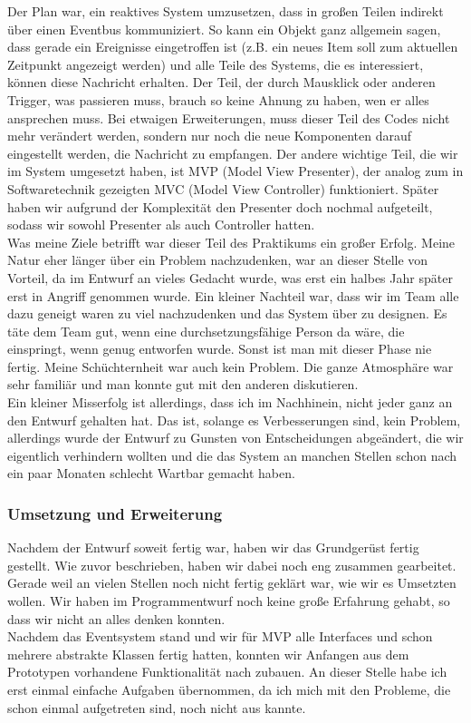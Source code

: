 Der Plan war, ein reaktives System umzusetzen, dass in großen Teilen indirekt über einen Eventbus kommuniziert. So kann ein Objekt ganz allgemein sagen, dass gerade ein Ereignisse eingetroffen ist (z.B. ein neues Item soll zum aktuellen Zeitpunkt angezeigt werden) und alle Teile des Systems, die es interessiert, können diese Nachricht erhalten. Der Teil, der durch Mausklick oder anderen Trigger, was passieren muss, brauch so keine Ahnung zu haben, wen er alles ansprechen muss. Bei etwaigen Erweiterungen, muss dieser Teil des Codes nicht mehr verändert werden, sondern nur noch die neue Komponenten darauf eingestellt werden, die Nachricht zu empfangen. Der andere wichtige Teil, die wir im System umgesetzt haben, ist MVP (Model View Presenter), der analog zum in Softwaretechnik gezeigten MVC (Model View Controller) funktioniert. Später haben wir aufgrund der Komplexität den Presenter doch nochmal aufgeteilt, sodass wir sowohl Presenter als auch Controller hatten.\\

Was meine Ziele betrifft war dieser Teil des Praktikums ein großer Erfolg. Meine Natur eher länger über ein Problem nachzudenken, war an dieser Stelle von Vorteil, da im Entwurf an vieles Gedacht wurde, was erst ein halbes Jahr später erst in Angriff genommen wurde. Ein kleiner Nachteil war, dass wir im Team alle dazu geneigt waren zu viel nachzudenken und das System über zu designen. Es täte dem Team gut, wenn eine durchsetzungsfähige Person da wäre, die einspringt, wenn genug entworfen wurde. Sonst ist man mit dieser Phase nie fertig. Meine Schüchternheit war auch kein Problem. Die ganze Atmosphäre war sehr familiär und man konnte gut mit den anderen diskutieren.\\

Ein kleiner Misserfolg ist allerdings, dass ich im Nachhinein, nicht jeder ganz an den Entwurf gehalten hat. Das ist, solange es Verbesserungen sind, kein Problem, allerdings wurde der Entwurf zu Gunsten von Entscheidungen abgeändert, die wir eigentlich verhindern wollten und die das System an manchen Stellen schon nach ein paar Monaten schlecht Wartbar gemacht haben.

\subsubsection{Umsetzung und Erweiterung}

Nachdem der Entwurf soweit fertig war, haben wir das Grundgerüst fertig gestellt. Wie zuvor beschrieben, haben wir dabei noch eng zusammen gearbeitet. Gerade weil an vielen Stellen noch nicht fertig geklärt war, wie wir es Umsetzten wollen. Wir haben im Programmentwurf noch keine große Erfahrung gehabt, so dass wir nicht an alles denken konnten.\\
Nachdem das Eventsystem stand und wir für MVP alle Interfaces und schon mehrere abstrakte Klassen fertig hatten, konnten wir Anfangen aus dem Prototypen vorhandene Funktionalität nach zubauen. An dieser Stelle habe ich erst einmal einfache Aufgaben übernommen, da ich mich mit den Probleme, die schon einmal aufgetreten sind, noch nicht aus kannte.

